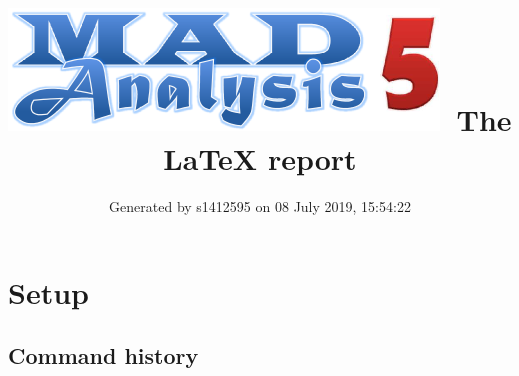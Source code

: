 \documentclass[a4paper, 10pt]{article}
\title{{\includegraphics[scale=.4]{logo.png}}\ The LaTeX report}
\author{Generated by s1412595 on 08 July 2019, 15:54:22}
\begin{document}
\maketitle
\flushbottom

\newpage
\section{ Setup}

\subsection{ Command history}
\end{document}
